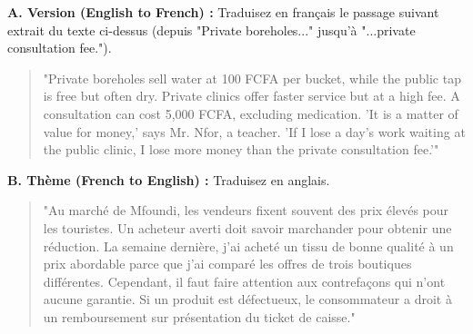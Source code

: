 \documentclass[11pt]{article}
\begin{document}
\begin{exercice}
\textbf{A. Version (English to French) :} Traduisez en français le passage suivant extrait du texte ci-dessus (depuis "Private boreholes..." jusqu'à "...private consultation fee.").
\begin{quote}
"Private boreholes sell water at 100 FCFA per bucket, while the public tap is free but often dry. Private clinics offer faster service but at a high fee. A consultation can cost 5,000 FCFA, excluding medication. 'It is a matter of value for money,' says Mr. Nfor, a teacher. 'If I lose a day's work waiting at the public clinic, I lose more money than the private consultation fee.'"
\end{quote}

\textbf{B. Thème (French to English) :} Traduisez en anglais.
\begin{quote}
"Au marché de Mfoundi, les vendeurs fixent souvent des prix élevés pour les touristes. Un acheteur averti doit savoir marchander pour obtenir une réduction. La semaine dernière, j'ai acheté un tissu de bonne qualité à un prix abordable parce que j'ai comparé les offres de trois boutiques différentes. Cependant, il faut faire attention aux contrefaçons qui n'ont aucune garantie. Si un produit est défectueux, le consommateur a droit à un remboursement sur présentation du ticket de caisse."
\end{quote}
\end{exercice}
\end{document}
